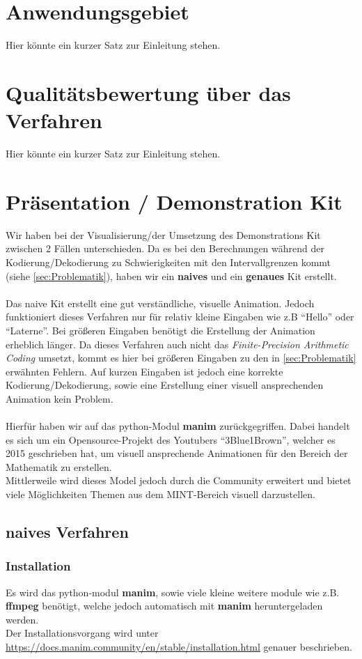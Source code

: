 \documentclass[a4paper]{article}
\theoremstyle{definition}
\theoremstyle{remark}
\begin{document}
		\section{Anwendungsgebiet}
	Hier könnte ein kurzer Satz zur Einleitung stehen.
	
			\section{Qualitätsbewertung über das Verfahren}
	Hier könnte ein kurzer Satz zur Einleitung stehen.
	
	\newpage
			\section{Präsentation / Demonstration Kit}
Wir haben bei der Visualisierung/der Umsetzung des Demonstrations Kit zwischen 2 Fällen unterschieden. Da es bei den Berechnungen während der Kodierung/Dekodierung zu Schwierigkeiten mit den Intervallgrenzen kommt (siehe \ref{sec:Problematik}), haben wir ein \textbf{naives} und ein \textbf{genaues} Kit erstellt.
\\
\\
Das naive Kit erstellt eine gut verständliche, visuelle Animation. Jedoch funktioniert dieses Verfahren nur für relativ kleine Eingaben wie z.B ``Hello'' oder ``Laterne''. Bei größeren Eingaben benötigt die Erstellung der Animation erheblich länger. Da dieses Verfahren auch nicht das \textit{Finite-Precision Arithmetic Coding} umsetzt, kommt es hier bei größeren Eingaben zu den in \ref{sec:Problematik} erwähnten Fehlern. Auf kurzen Eingaben ist jedoch eine korrekte
Kodierung/Dekodierung, sowie eine Erstellung einer visuell ansprechenden Animation kein Problem. 
\\
\\
Hierfür haben wir auf das python-Modul \textbf{manim} zurückgegriffen. Dabei handelt es sich um ein Opensource-Projekt des Youtubers ``3Blue1Brown'', welcher es 2015 geschrieben hat, um visuell ansprechende Animationen für den Bereich der Mathematik zu erstellen.\cite{3blue1brown}
\\
Mittlerweile wird dieses Model jedoch durch die Community erweitert und bietet viele Möglichkeiten Themen aus dem MINT-Bereich visuell darzustellen.
\subsection{naives Verfahren}
\label{sec:manim}
\subsubsection{Installation}
Es wird das python-modul \textbf{manim}, sowie viele kleine weitere module wie z.B. \textbf{ffmpeg} benötigt, welche jedoch automatisch mit \textbf{manim} heruntergeladen werden.\\
Der Installationsvorgang wird unter \href{https://docs.manim.community/en/stable/installation.html}{https://docs.manim.community/en/stable/installation.html}
genauer beschrieben.
\\
\end{document}
